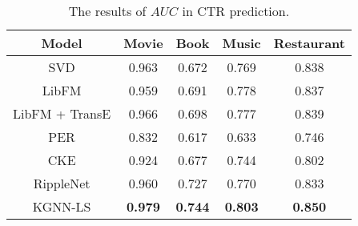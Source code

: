 \documentclass[sigconf]{acmart}
\begin{document}
			\begin{table}[t]
    			\centering
    			\setlength{\tabcolsep}{6pt}
    			\begin{tabular}{c|cccc}
    				\hline
    				Model & Movie & Book & Music & Restaurant \\
            		\hline
            		SVD & 0.963 & 0.672 & 0.769 & 0.838 \\
            		LibFM & 0.959 & 0.691 & 0.778 & 0.837 \\
            		LibFM + TransE & 0.966 & 0.698 & 0.777 & 0.839 \\
            		PER & 0.832 & 0.617 & 0.633 & 0.746 \\
            		CKE & 0.924 & 0.677 & 0.744 & 0.802 \\
            		RippleNet & 0.960 & 0.727 & 0.770 & 0.833 \\
            		\hline
            		KGNN-LS & \textbf{0.979} & \textbf{0.744} & \textbf{0.803} & \textbf{0.850} \\
            		\hline
				\end{tabular}
				\vspace{0.05in}
				\caption{The results of $AUC$ in CTR prediction.}
				\label{table:ctr}
				\vspace{-0.2in}
			\end{table}
		
\end{document}
